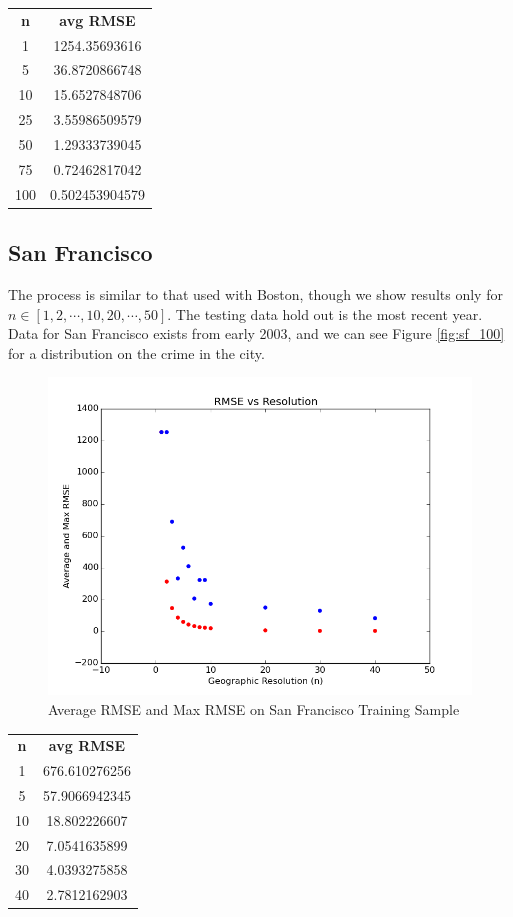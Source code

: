 \documentclass[11pt]{article}
\begin{document}
\begin{center}
\begin{tabular}{c|c}
 \textbf{n} & \textbf{avg RMSE} \\
 1 & 1254.35693616 \\
 5 & 36.8720866748 \\
 10 & 15.6527848706 \\
 25 & 3.55986509579 \\
 50 & 1.29333739045 \\
 75 & 0.72462817042 \\
 100 & 0.502453904579 \\
\end{tabular}
\end{center}

\subsection{San Francisco}
The process is similar to that used with Boston, though we show results only for $n \in [1,2,\cdots,10,20,\cdots,50]$. The testing data hold out is the most recent year. Data for San Francisco exists from early 2003, and we can see Figure \ref{fig:sf_100} for a distribution on the crime in the city.

\begin{figure}[h!]
\centering
\includegraphics[scale=0.6]{sf_linear.png}
\caption{Average RMSE and Max RMSE on San Francisco Training Sample}
\label{fig:sf_rmse}
\end{figure}

\begin{center}
\begin{tabular}{c|c}
 \textbf{n} & \textbf{avg RMSE} \\
 1 & 676.610276256 \\
 5 & 57.9066942345 \\
 10 & 18.802226607 \\
 20 & 7.0541635899 \\ 
 30 & 4.0393275858 \\
 40 & 2.7812162903
\end{tabular}
\end{center}
\end{document}

